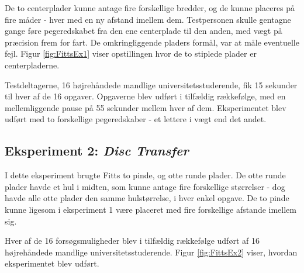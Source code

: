 De to centerplader kunne antage fire forskellige bredder, og de kunne placeres på fire måder - hver med en ny afstand imellem dem. Testpersonen skulle gentagne gange føre pegeredskabet fra den ene centerplade til den anden, med vægt på præcision frem for fart. De omkringliggende pladers formål, var at måle eventuelle fejl. Figur \ref{fig:FittsEx1} viser opstillingen hvor de to stiplede plader er centerpladerne.

Testdeltagerne, 16 højrehåndede mandlige universitetsstuderende, fik 15 sekunder til hver af de 16 opgaver. Opgaverne blev udført i tilfældig rækkefølge, med en mellemliggende pause på 55 sekunder mellem hver af dem. Eksperimentet blev udført med to forskellige pegeredskaber - et lettere i vægt end det andet.

\subsection*{Eksperiment 2: \textit{Disc Transfer}}
I dette eksperiment brugte Fitts to pinde, og otte runde plader. De otte runde plader havde et hul i midten, som kunne antage fire forskellige størrelser - dog havde alle otte plader den samme hulstørrelse, i hver enkel opgave. De to pinde kunne ligesom i eksperiment 1 være placeret med fire forskellige afstande imellem sig. 

Hver af de 16 forsøgsmuligheder blev i tilfældig rækkefølge udført af 16 højrehåndede mandlige universitetsstuderende. Figur \ref{fig:FittsEx2} viser, hvordan eksperimentet blev udført.

